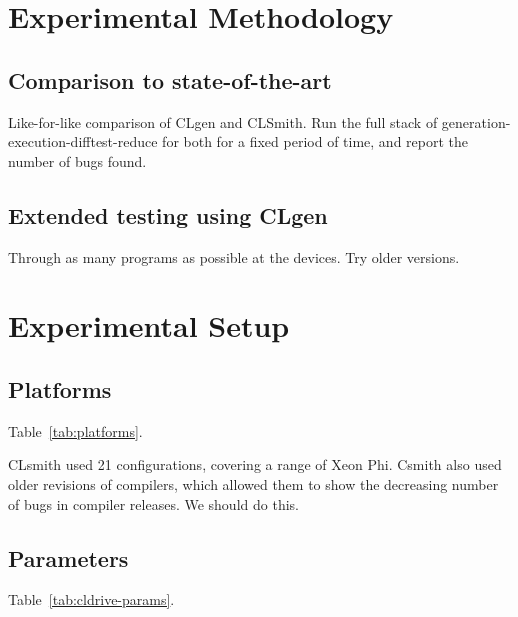 \section{Experimental Methodology}\label{sec:methodology}


\subsection{Comparison to state-of-the-art}

Like-for-like comparison of CLgen and CLSmith. Run the full stack of generation-execution-difftest-reduce for both for a fixed period of time, and report the number of bugs found.


\subsection{Extended testing using CLgen}

Through as many programs as possible at the devices. Try older versions.



\section{Experimental Setup}\label{sec:setup}
\subsection{Platforms}

Table~\ref{tab:platforms}.

CLsmith used 21 configurations, covering a range of Xeon Phi. Csmith also used older revisions of compilers, which allowed them to show the decreasing number of bugs in compiler releases. We should do this.



\subsection{Parameters}

Table~\ref{tab:cldrive-params}. 